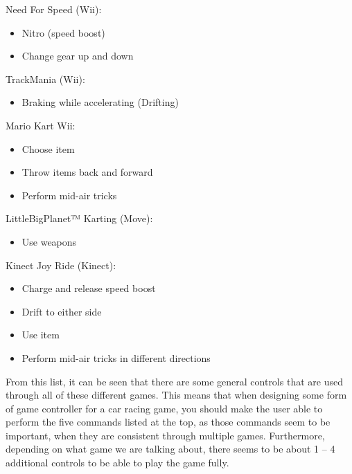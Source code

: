 Need For Speed (Wii):
\begin{itemize}
\item Nitro (speed boost)
\item Change gear up and down
\end{itemize}

TrackMania (Wii):
\begin{itemize}
\item Braking while accelerating (Drifting)
\end{itemize}

Mario Kart Wii:
\begin{itemize}
\item Choose item
\item Throw items back and forward
\item Perform mid-air tricks
\end{itemize}

LittleBigPlanet™ Karting (Move):
\begin{itemize}
\item Use weapons
\end{itemize}

Kinect Joy Ride (Kinect):
\begin{itemize}
\item Charge and release speed boost
\item Drift to either side
\item Use item
\item Perform mid-air tricks in different directions
\end{itemize}

From this list, it can be seen that there are some general controls that are used through all of these different games. This means that when designing some form of game controller for a car racing game, you should make the user able to perform the five commands listed at the top, as those commands seem to be important, when they are consistent through multiple games. Furthermore, depending on what game we are talking about, there seems to be about 1 – 4 additional controls to be able to play the game fully.

